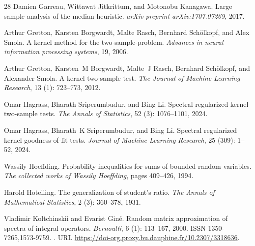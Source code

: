 \documentclass[twoside,11pt]{article}
\begin{document}
\begin{thebibliography}{28}
	Damien Garreau, Wittawat Jitkrittum, and Motonobu Kanagawa.
	\newblock Large sample analysis of the median heuristic.
	\newblock \emph{arXiv preprint arXiv:1707.07269}, 2017.
	
	Arthur Gretton, Karsten Borgwardt, Malte Rasch, Bernhard Sch{\"o}lkopf, and
	Alex Smola.
	\newblock A kernel method for the two-sample-problem.
	\newblock \emph{Advances in neural information processing systems}, 19, 2006.
	
	Arthur Gretton, Karsten~M Borgwardt, Malte~J Rasch, Bernhard Sch{\"o}lkopf, and
	Alexander Smola.
	\newblock A kernel two-sample test.
	\newblock \emph{The Journal of Machine Learning Research}, 13
	(1): 723--773, 2012.
	
	Omar Hagrass, Bharath Sriperumbudur, and Bing Li.
	\newblock Spectral regularized kernel two-sample tests.
	\newblock \emph{The Annals of Statistics}, 52 (3):
	1076--1101, 2024{}.
	
	Omar Hagrass, Bharath~K Sriperumbudur, and Bing Li.
	\newblock Spectral regularized kernel goodness-of-fit tests.
	\newblock \emph{Journal of Machine Learning Research}, 25
	(309): 1--52, 2024{}.
	
	Wassily Hoeffding.
	\newblock Probability inequalities for sums of bounded random variables.
	\newblock \emph{The collected works of Wassily Hoeffding}, pages 409--426,
	1994.
	
	Harold Hotelling.
	\newblock The generalization of student's ratio.
	\newblock \emph{The Annals of Mathematical Statistics}, 2
	(3): 360--378, 1931.
	
	Vladimir Koltchinskii and Evarist Gin\'e.
	\newblock Random matrix approximation of spectra of integral operators.
	\newblock \emph{Bernoulli}, 6 (1): 113--167, 2000.
	\newblock ISSN 1350-7265,1573-9759.
	\newblock {}.
	\newblock URL \url{https://doi-org.proxy.bu.dauphine.fr/10.2307/3318636}.
	

\end{thebibliography}
\end{document}
